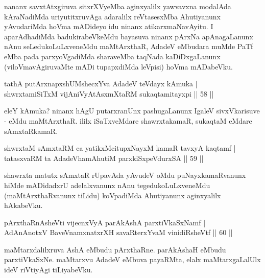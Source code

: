\begin{artha}
nananx savxtAtxgiruva sitxrXVyeMba aginxyalilx yawvavxna modalAda kAraNadiMda uriyutitxruvAga adaralilx reVtasesxMba Ahutiyanunx yAvudariMda hoVma mADideyo idu ninanx atikarxmaNavAyitu. I aparAdhadiMda badukirabeVkeMdu bayasuva ninanx pArxNa apAnagaLanunx nAnu seLedukoLuLxveneMdu maMtArxthaR, AdadeV eMbudara muMde PaTf eMba pada parxyoVgadiMda sharaveMba taqNada kaDiDxgaLanunx (viloVmavAgiruvaMte mADi tupapxdiMda leVpisi) hoVma mADabeVku.
\end{artha}


\begin{shl}
tathA putArxnapxshUMshecxYva AdadeV teV\s dayx kAmuka | \\
shwrxtamiSiTxM vijAniVyAtAsxmXtaRM sukaqtamitayxpi \hfill|| 58 || 
\end{shl}

\begin{artha}
eleY kAmuka? ninanx hAgU putarxranUnx pashugaLanunx IgaleV sivxVkarisuve - eMdu maMtArxthaR. ililx iSaTxveMdare shawrxtakamaR, sukaqtaM eMdare sAmxtaRkamaR.
\end{artha}

\begin{shl}
shwrxtaM sAmxtaRM ca yatikxMcitupxNayxM kamaR tavxyA kaqtamf | \\
tatasxvaRM ta AdadeV\s hamAhutiM parxkiSxpeVdurxSA \hfill|| 59 || 
\end{shl}

\begin{artha}
shawrxta matutx sAmxtaR rUpavAda yAvudeV oMdu puNayxkamaRvanunx hiMde mADidadxrU adelalxvanunx nAnu tegedukoLuLxveneMdu (maMtArxthaRvanunx tiLidu) koVpadiMda Ahutiyanunx aginxyalilx hAkabeVku.
\end{artha}

\begin{shl}
pArxthaRnA\s \s sheVti vijecnxVyA parAkAshA parxtiVkaSxNamf | \\
AdAnAnotxV BaveVnamxnatxrXH savaRterxYvaM vinidiRsheVtf \hfill|| 60 || 
\end{shl}

\begin{artha}
maMtarxdalilxruva AshA eMbudu pArxthaRne. parAkAshaH eMbudu parxtiVkaSxNe. maMtarxvu AdadeV eMbuva payaRMta, elalx maMtarxgaLalUlx ideV riVtiyAgi tiLiyabeVku.
\end{artha}

